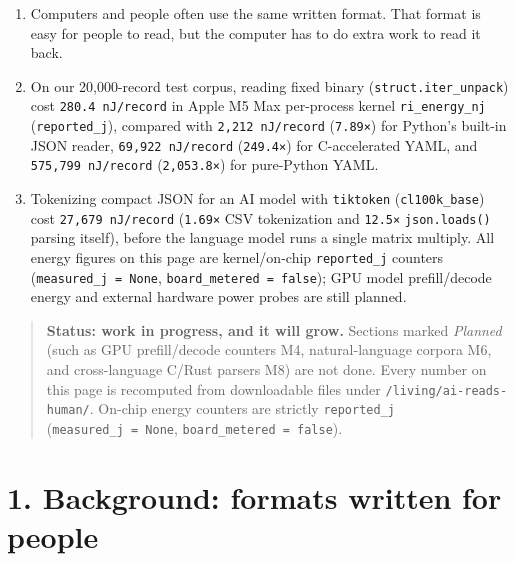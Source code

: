 \documentclass[10pt,letterpaper]{article}
\providecommand{\tightlist}{\setlength{\itemsep}{1pt}\setlength{\parskip}{0pt}}
\begin{document}
\begin{enumerate}
\def\labelenumi{\arabic{enumi}.}
\tightlist
\item
  Computers and people often use the same written format. That format is
  easy for people to read, but the computer has to do extra work to read
  it back.
\item
  On our 20,000-record test corpus, reading fixed binary
  (\texttt{struct.\allowbreak{}iter\_\allowbreak{}unpack}) cost \texttt{280.\allowbreak{}4\ nJ/\allowbreak{}record} in Apple
  M5 Max per-process kernel \texttt{ri\_energy\_nj}
  (\texttt{reported\_j}), compared with \texttt{2,\allowbreak{}212\ nJ/\allowbreak{}record}
  (\texttt{7.89×}) for Python's built-in JSON reader,
  \texttt{69,\allowbreak{}922\ nJ/\allowbreak{}record} (\texttt{249.4×}) for C-accelerated YAML,
  and \texttt{575,\allowbreak{}799\ nJ/\allowbreak{}record} (\texttt{2,053.8×}) for pure-Python
  YAML.
\item
  Tokenizing compact JSON for an AI model with \texttt{tiktoken}
  (\texttt{cl100k\_base}) cost \texttt{27,\allowbreak{}679\ nJ/\allowbreak{}record}
  (\texttt{1.69×} CSV tokenization and \texttt{12.5×}
  \texttt{json.loads()} parsing itself), before the language model runs
  a single matrix multiply. All energy figures on this page are
  kernel/on-chip \texttt{reported\_j} counters
  (\texttt{measured\_\allowbreak{}j\ =\ None}, \texttt{board\_\allowbreak{}metered\ =\ false});
  GPU model prefill/decode energy and external hardware power probes are
  still planned.
\end{enumerate}

\begin{quote}
\textbf{Status: work in progress, and it will grow.} Sections marked
\emph{Planned} (such as GPU prefill/decode counters M4, natural-language
corpora M6, and cross-language C/Rust parsers M8) are not done. Every
number on this page is recomputed from downloadable files under
\texttt{/\allowbreak{}living/\allowbreak{}ai-\allowbreak{}reads-\allowbreak{}human/\allowbreak{}}. On-chip energy counters are strictly
\texttt{reported\_j} (\texttt{measured\_\allowbreak{}j\ =\ None},
\texttt{board\_\allowbreak{}metered\ =\ false}).
\end{quote}

\section{1. Background: formats written for
people}\label{background-formats-written-for-people}
\end{document}
